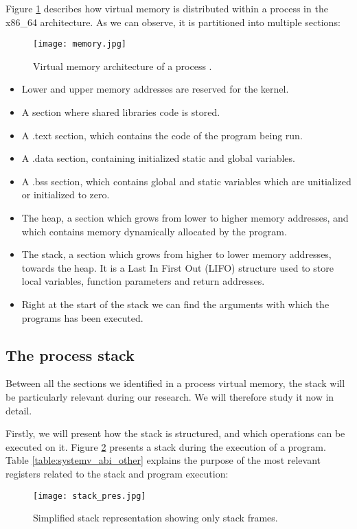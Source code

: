 Figure \ref{fig:mem_proc_arch} describes how virtual memory is distributed within a process in the x86\_64 architecture. As we can observe, it is partitioned into multiple sections:
\begin{figure}[htbp]
	\centering
	\texttt{[image: memory.jpg]}
	\caption{Virtual memory architecture of a process \cite{mem_arch_proc}.}
	\label{fig:mem_proc_arch}
\end{figure}
\begin{itemize}
\item Lower and upper memory addresses are reserved for the kernel.
\item A section where shared libraries code is stored.
\item A .text section, which contains the code of the program being run.
\item A .data section, containing initialized static and global variables.
\item A .bss section, which contains global and static variables which are unitialized or initialized to zero.
\item The heap, a section which grows from lower to higher memory addresses, and which contains memory dynamically allocated by the program.
\item The stack, a section which grows from higher to lower memory addresses, towards the heap. It is a Last In First Out (LIFO) structure used to store local variables, function parameters and return addresses.
\item Right at the start of the stack we can find the arguments with which the programs has been executed.
\end{itemize}

\subsection{The process stack} \label{subsection:stack}
Between all the sections we identified in a process virtual memory, the stack will be particularly relevant during our research. We will therefore study it now in detail. 

Firstly, we will present how the stack is structured, and which operations can be executed on it. Figure \ref{fig:stack_pres} presents a stack during the execution of a program. Table \ref{table:systemv_abi_other} explains the purpose of the most relevant registers related to the stack and program execution:

\begin{figure}[htbp]
	\centering
	\texttt{[image: stack\_pres.jpg]}
	\caption{Simplified stack representation showing only stack frames.}
	\label{fig:stack_pres}
\end{figure}

